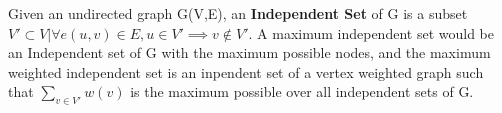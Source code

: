Given an undirected graph G(V,E), an {\bfseries Independent Set} of G is a subset $V' \subset V | \forall e(u,v) \in E, u \in V' \implies v \notin V'$. A maximum independent set would be an Independent set of G with the maximum possible nodes, and the maximum weighted independent set is an inpendent set of a vertex weighted graph such that $\sum_{v \in V'} w(v)$ is the maximum possible over all independent sets of G.